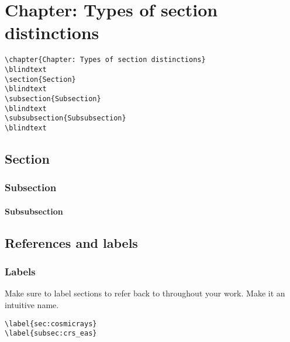 
\acresetall %


\chapter{Chapter: Types of section distinctions}

\begin{lstlisting}
\chapter{Chapter: Types of section distinctions}
\blindtext
\section{Section} 
\blindtext
\subsection{Subsection}
\blindtext
\subsubsection{Subsubsection}
\blindtext
\end{lstlisting}
\blindtext
\section{Section} 
\blindtext
\subsection{Subsection}
\blindtext
\subsubsection{Subsubsection}
\blindtext



\section{References and labels}



\subsection{Labels}


Make sure to label sections to refer back to throughout your work. Make it an intuitive name.
%
\begin{lstlisting}
\label{sec:cosmicrays}
\label{subsec:crs_eas}
\end{lstlisting}



